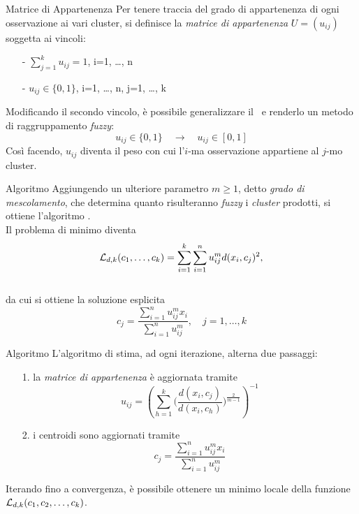 \documentclass{beamer}
\begin{document}
\begin{frame}{Matrice di Appartenenza}
    Per tenere traccia del grado di appartenenza di ogni osservazione ai vari cluster, si definisce la \emph{matrice di appartenenza} $U = \left( u_{ij} \right)$ soggetta ai vincoli:\\[.5cm]
    \begin{itemize}
        \item[-] $\sum_{j=1}^{k} u_{ij} = 1$, \quad i=1, \ldots, n
        \item[-] $u_{ij} \in \{0,1\}$, \quad i=1, \ldots, n, j=1, \ldots, k
    \end{itemize}
    \pause
    Modificando il secondo vincolo, è possibile generalizzare il \km\ e renderlo un metodo di raggruppamento \emph{fuzzy}:
    \[
    u_{ij} \in \{0,1\} \quad \rightarrow \quad u_{ij} \in [0,1]
    \]
    Così facendo, $u_{ij}$ diventa il peso con cui l'$i$-ma osservazione appartiene al $j$-mo cluster.
\end{frame}


\begin{frame}{Algoritmo \fcm}
    Aggiungendo un ulteriore parametro $m \geqslant 1$, detto \textit{grado di mescolamento}, che determina quanto risulteranno \emph{fuzzy} i \textit{cluster} prodotti, si ottiene l'algoritmo \fcm.
    \\[.5cm]
    Il problema di minimo diventa
    \[
     \mathcal{L}_{d,k}(c_1, \ldots, c_k) = \sum_{i=1}^{k} \sum_{i=1}^{n} u_{ij}^{m}d(x_i, c_j)^2 ,
    \]
    \\[.5cm]
    da cui si ottiene la soluzione esplicita
    \[
        c_j = \frac{ \sum_{i=1}^{n} u_{ij}^{m} x_i}{\sum_{i=1}^{n} u_{ij}^{m}}, \quad j=1, \ldots, k
    \]
\end{frame}


\begin{frame}{Algoritmo \fcm}
    L'algoritmo di stima, ad ogni iterazione, alterna due passaggi:
    \\[.5cm]
    \begin{itemize}
        \item[1.] la \emph{matrice di appartenenza} è aggiornata tramite
        \[
        u_{ij} = \left(\sum_{h=1}^{k} \Big(\frac{d(x_i, c_j)}{d(x_i, c_h)}\Big)^{\frac{2}{m-1}}\right)^{-1}
        \]
        \item[2.] i centroidi sono aggiornati tramite
        \[
        c_j = \dfrac{\sum_{i=1}^{n} u_{ij}^{m}x_i}{\sum_{i=1}^{n} u_{ij}^{m}}
        \]
    \end{itemize}
    Iterando fino a convergenza, è possibile ottenere un minimo locale della funzione $ \mathcal{L}_{d,k}(c_1, c_2, \ldots, c_k)$.
\end{frame}
\end{document}
